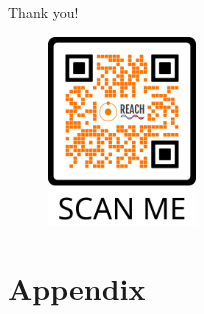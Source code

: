 \documentclass[aspectratio=169]{beamer}
\begin{document}
\begin{frame}{\small{Thank you!}}
	\begin{figure}
		\centering
		\includegraphics[width=0.35\textwidth]{images/qr.png}
	\end{figure}
\end{frame}

\appendix
\section{Appendix}
\end{document}

